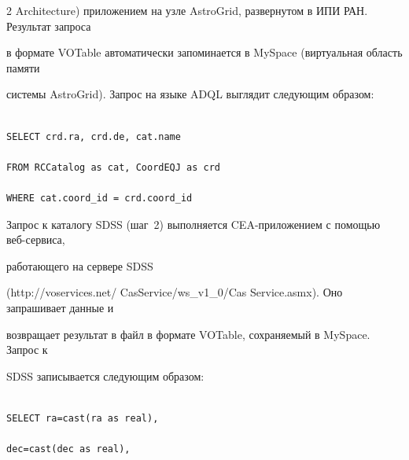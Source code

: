 \begin{multicols}{2}
{Architecture}) приложением на узле AstroGrid, развернутом в ИПИ РАН. Результат запроса 

в формате VOTable автоматически запоминается в MySpace (виртуальная область памяти 

сис\-те\-мы AstroGrid). Запрос на языке ADQL выглядит следующим образом: 









\noindent

{\small

\begin{verbatim}

SELECT crd.ra, crd.de, cat.name 

FROM RCCatalog as cat, CoordEQJ as crd

WHERE cat.coord_id = crd.coord_id

\end{verbatim}

}







      

Запрос к каталогу SDSS (шаг~2) выполняется CEA-приложением с помощью веб-сер\-ви\-са, 

работающего на сервере SDSS 

({\sf http://voservices.net/ CasService/ws\_v1\_0/Cas} Service.asmx). Оно запрашивает данные и 

возвращает результат в файл в формате VOTable, сохраняемый в MySpace. Запрос к 

SDSS записывается следующим образом: 









\noindent

{\small

\begin{verbatim}

SELECT ra=cast(ra as real),

dec=cast(dec as real), 


\end{verbatim}}
\end{multicols}
